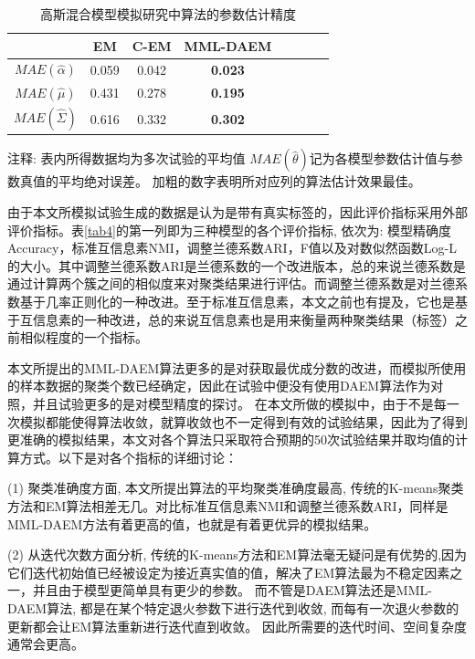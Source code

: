 \documentclass[a4paper,12pt,openany,oneside,utf-8]{ctexbook}
\begin{document}
	\begin{table}[H]  
		\centering
		\caption{高斯混合模型模拟研究中算法的参数估计精度}
		\label{tab5}
		\medskip
		\begin{tabular}{c ccccccc}
			\hline  %
			& EM & C-EM & MML-DAEM &\\
			\hline
			
			$MAE(\hat{\alpha})$ & 0.059         & 0.042             & \textbf{0.023}              &\\
			$MAE(\hat{\mu})$    & 0.431        & 0.278              & \textbf{0.195}              &\\
			$MAE(\hat{\Sigma})$ & 0.616         & 0.332              & \textbf{0.302}              &\\
			\hline
		\end{tabular}
		\begin{tablenotes}
			\footnotesize
			\item 注释: 表内所得数据均为多次试验的平均值 $MAE(\hat{\theta})$记为各模型参数估计值与参数真值的平均绝对误差。 加粗的数字表明所对应列的算法估计效果最佳。
		\end{tablenotes}
	\end{table}
	

	
	
	由于本文所模拟试验生成的数据是认为是带有真实标签的，因此评价指标采用外部评价指标。表\ref{tab4}的第一列即为三种模型的各个评价指标, 依次为: 模型精确度Accuracy，标准互信息素NMI，调整兰德系数ARI，F值以及对数似然函数Log-L的大小。其中调整兰德系数ARI是兰德系数的一个改进版本，总的来说兰德系数是通过计算两个簇之间的相似度来对聚类结果进行评估。而调整兰德系数是对兰德系数基于几率正则化的一种改进。至于标准互信息素，本文之前也有提及，它也是基于互信息素的一种改进，总的来说互信息素也是用来衡量两种聚类结果（标签）之前相似程度的一个指标。
	
	本文所提出的MML-DAEM算法更多的是对获取最优成分数的改进，而模拟所使用的样本数据的聚类个数已经确定，因此在试验中便没有使用DAEM算法作为对照，并且试验更多的是对模型精度的探讨。
	在本文所做的模拟中，由于不是每一次模拟都能使得算法收敛，就算收敛也不一定得到有效的试验结果，因此为了得到更准确的模拟结果，本文对各个算法只采取符合预期的50次试验结果并取均值的计算方式。以下是对各个指标的详细讨论：
	
	\noindent(1) 聚类准确度方面, 本文所提出算法的平均聚类准确度最高, 传统的K-means聚类方法和EM算法相差无几。对比标准互信息素NMI和调整兰德系数ARI，同样是MML-DAEM方法有着更高的值，也就是有着更优异的模拟结果。
	
	\noindent(2) 从迭代次数方面分析, 传统的K-means方法和EM算法毫无疑问是有优势的,因为它们迭代初始值已经被设定为接近真实值的值，解决了EM算法最为不稳定因素之一，并且由于模型更简单具有更少的参数。 而不管是DAEM算法还是MML-DAEM算法, 都是在某个特定退火参数下进行迭代到收敛, 而每有一次退火参数的更新都会让EM算法重新进行迭代直到收敛。 因此所需要的迭代时间、空间复杂度通常会更高。
	
\end{document}
